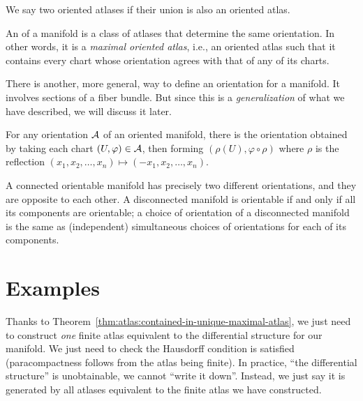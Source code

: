 \begin{definition}
We say two oriented atlases  if their
union is also an oriented atlas.
\end{definition}

\begin{definition}
An  of a manifold is a class of atlases that
determine the same orientation. In other words, it is a \emph{maximal oriented atlas},
i.e., an oriented atlas such that it contains every chart whose
orientation agrees with that of any of its charts.
\end{definition}

\begin{remark}
There is another, more general, way to define an orientation for a
manifold. It involves sections of a fiber bundle. But since this is a
\emph{generalization} of what we have described, we will discuss it
later.
\end{remark}

\begin{definition}
For any orientation $\mathcal{A}$ of an oriented manifold, there is the 
orientation obtained by taking each chart $(U,\varphi)\in\mathcal{A}$,
then forming $(\rho(U),\varphi\circ\rho)$ where $\rho$ is the reflection
$(x_{1}, x_{2},\dots, x_{n})\mapsto(-x_{1},x_{2},\dots,x_{n})$.
\end{definition}

\begin{proposition}
A connected orientable manifold has precisely two different
orientations, and they are opposite to each other. A disconnected
manifold is orientable if and only if all its components are orientable;
a choice of orientation of a disconnected manifold is the same as
(independent) simultaneous choices of orientations for each of its components.
\end{proposition}

\section{Examples}

Thanks to Theorem~\ref{thm:atlas:contained-in-unique-maximal-atlas},
we just need to construct \emph{one} finite atlas equivalent to the
differential structure for our manifold. We just need to check the
Hausdorff condition is satisfied (paracompactness follows from the atlas
being finite). In practice, ``the differential
structure'' is unobtainable, we cannot ``write it down''. Instead, we
just say it is generated by all atlases equivalent to the finite atlas
we have constructed.

